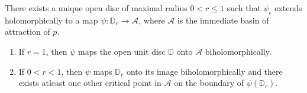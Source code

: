 \begin{theorem} There exists a unique open disc of maximal radius $0<r \leq 1$ such that $\psi_{\epsilon}$ extends holomorphically to a map $\psi: \mathbb{D}_{r} \rightarrow \mathcal{A}$, where $\mathcal{A}$ is the immediate basin of attraction of $p$.

\begin{enumerate}
  \item If $r=1$, then $\psi$ maps the open unit disc $\mathbb{D}$ onto $\mathcal{A}$ biholomorphically.

  \item If $0<r<1$, then $\psi$ maps $\mathbb{D}_{r}$ onto its image biholomorphically and there exists atleast one other critical point in $\mathcal{A}$ on the boundary of $\psi\left(\mathbb{D}_{r}\right)$.
\end{enumerate}
\end{theorem}
